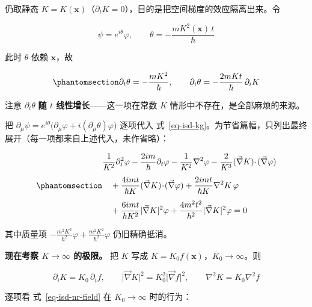 \documentclass[
  chinese,
  a4paper,
  UTF8,
  12pt,
  oneside,
  openany]{ctexbook}
\theoremstyle{plain}
\theoremstyle{plain}
\theoremstyle{plain}
\theoremstyle{definition}
\theoremstyle{plain}
\theoremstyle{plain}
\theoremstyle{remark}
\begin{document}
仍取静态
\(K=K(\mathbf{x})\)（\(\partial_tK=0\)），目的是把空间梯度的效应隔离出来。令

\[
\psi=e^{i\theta}\varphi,\qquad \theta=-\frac{mK^{2}(\mathbf{x})\,t}{\hbar}
\]

此时 \(\theta\) 依赖 \(\mathbf{x}\)，故

\begin{equation}\protect\phantomsection\label{eq-isd-theta}{
\partial_t\theta=-\frac{mK^{2}}{\hbar},\qquad
\partial_i\theta=-\frac{2mKt}{\hbar}\,\partial_iK
}\end{equation}

注意 \(\partial_i\theta\) \textbf{随 \(t\) 线性增长}------这一项在常数
\(K\) 情形中不存在，是全部麻烦的来源。

把
\(\partial_\mu\psi=e^{i\theta}\bigl(\partial_\mu\varphi+i(\partial_\mu\theta)\varphi\bigr)\)
逐项代入
式~\ref{eq-isd-kg}。为节省篇幅，只列出最终展开（每一项都来自上述代入，未作省略）：

\begin{equation}\protect\phantomsection\label{eq-isd-nr-field}{
\begin{aligned}
&\frac{1}{K^{2}}\partial_t^{2}\varphi
-\frac{2im}{\hbar}\partial_t\varphi
-\frac{1}{K^{2}}\nabla^{2}\varphi
-\frac{2}{K^{3}}(\vec\nabla K)\!\cdot\!(\vec\nabla\varphi)\\[4pt]
&\quad+\frac{4imt}{\hbar K}(\vec\nabla K)\!\cdot\!(\vec\nabla\varphi)
+\frac{2imt}{\hbar K}\nabla^{2}K\,\varphi\\[4pt]
&\quad+\frac{6imt}{\hbar K^{2}}\lvert\vec\nabla K\rvert^{2}\varphi
+\frac{4m^{2}t^{2}}{\hbar^{2}}\lvert\vec\nabla K\rvert^{2}\varphi=0
\end{aligned}
}\end{equation}

其中质量项
\(-\frac{m^{2}K^{2}}{\hbar^{2}}\varphi+\frac{m^{2}K^{2}}{\hbar^{2}}\varphi\)
仍旧精确抵消。

\textbf{现在考察 \(K\to\infty\) 的极限。} 把 \(K\) 写成
\(K=K_0f(\mathbf{x})\)，\(K_0\to\infty\)。则

\[
\partial_iK=K_0\,\partial_if,\qquad
\lvert\vec\nabla K\rvert^{2}=K_0^{2}\lvert\vec\nabla f\rvert^{2},\qquad
\nabla^{2}K=K_0\nabla^{2}f
\]

逐项看 式~\ref{eq-isd-nr-field} 在 \(K_0\to\infty\) 时的行为：
\end{document}
